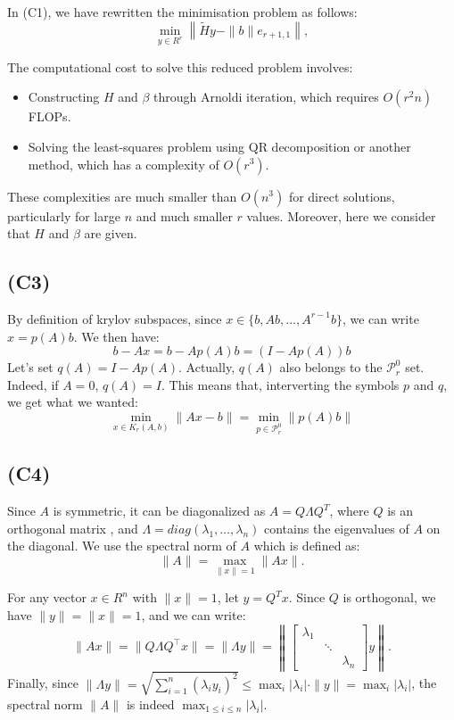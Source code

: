 \documentclass{article}
\begin{document}
In (C1), we have rewritten the minimisation problem as follows: 
\[
\min_{y \in R^r} \left\| \tilde{H} y - \|b\| e_{r+1,1} \right\|,
\]



The computational cost to solve this reduced problem involves:
\begin{itemize}
    \item Constructing $ H $ and $ \beta $ through Arnoldi iteration, which requires $ O(r^2 n) $ FLOPs.
    \item Solving the least-squares problem using QR decomposition or another method,
     which has a complexity of $ O(r^3) $.
\end{itemize}
These complexities are much smaller than $ O(n^3) $ for direct solutions, particularly for large $ n $ and much smaller $ r $ values. Moreover, 
here we consider that $H$ and $\beta$ are given. 

\subsection*{(C3)}
By definition of krylov subspaces, since $x \in \{b, Ab, ..., A^{r-1}b\}$, 
we can write $x=p(A)b$. We then have:
\[
b -Ax = b - A p(A)b = (I-A p(A))b 
\]
Let's set $q(A) = I-A p(A)$. Actually, $q(A)$ also belongs to the
 $\mathcal{P}_r^0$ set. Indeed, if $A = 0$, $q(A) = I$. This means that, interverting the symbols $p$ and $q$, 
 we get what we wanted: 
 \[
\min_{x \in K_r(A, b)} \|Ax - b\|  = \min_{p \in \mathcal{P}_r^0} \|p(A)b\|
 \]

\subsection*{(C4)}
Since $ A $ is symmetric, it can be diagonalized as $ A = Q \Lambda Q^T $, 
where $ Q $ is an orthogonal matrix , and $ \Lambda = diag(\lambda_1, \dots, \lambda_n) $ contains the eigenvalues of $ A $ on the diagonal.
We use the spectral norm of $ A $ which is defined as:
   \[
   \|A\| = \max_{\|x\| = 1} \|Ax\|.
   \]

For any vector $ x \in R^n $ with $ \|x\| = 1 $, let $ y = Q^T x $. 
Since $ Q $ is orthogonal, we have $ \|y\| = \|x\| = 1 $, and we can write:
 \[
\|Ax\| = \|Q \Lambda Q^\top x\| = \|\Lambda y\| = \left\|
   [\begin{array}{ccc}
        \lambda_1 & &  \\
         & \ddots &  \\
         & & \lambda_n 
    \end{array} ] y\right \|.
\]
Finally, since $ \|\Lambda y\| = \sqrt{\sum_{i=1}^n (\lambda_i y_i)^2} \leq \max_{i} |\lambda_i| \cdot \|y\| = \max_{i} |\lambda_i| $, the spectral norm $ \|A\| $ is indeed $ \max_{1 \leq i \leq n} |\lambda_i| $.
\end{document}
